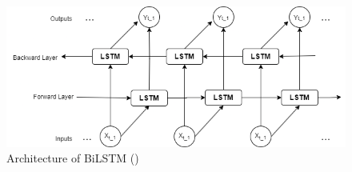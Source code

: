 \documentclass[a4paper,fleqn]{cas-sc}
\begin{document}
\begin{figure}[h!]
  \centering
  \includegraphics[scale=0.6]{img/Bilstm}
  \caption{Architecture of BiLSTM (\cite{article})} \label{Bilstm}
\end{figure}
\end{document}
